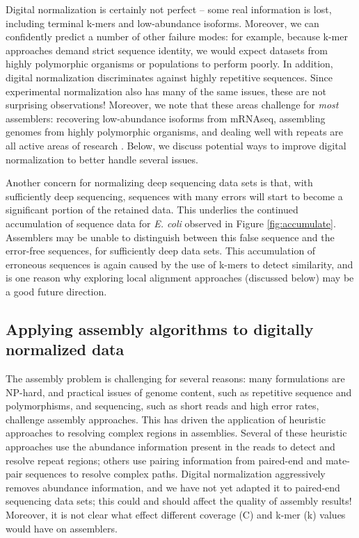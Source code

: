 \documentclass[10pt]{article}
\begin{document}
Digital normalization is certainly not perfect -- some real
information is lost, including terminal k-mers and low-abundance
isoforms.  Moreover, we can confidently predict a number of other
failure modes: for example, because k-mer approaches demand strict
sequence identity, we would expect datasets from highly polymorphic
organisms or populations to perform poorly.  In addition, digital
normalization discriminates against highly repetitive sequences. Since
experimental normalization also has many of the same issues, these are
not surprising observations!  Moreover, we note that these areas
challenge for {\em most} assemblers: recovering low-abundance isoforms
from mRNAseq, assembling genomes from highly polymorphic organisms,
and dealing well with repeats are all active areas of research
\cite{pubmed18549302,pubmed20633259,pubmed18541131}.  Below, we
discuss potential ways to improve digital normalization to better
handle several issues.

Another concern for normalizing deep sequencing data sets is that,
with sufficiently deep sequencing, sequences with many errors will
start to become a significant portion of the retained data.  This
underlies the continued accumulation of sequence data for {\em
  E. coli} observed in Figure \ref{fig:accumulate}.  Assemblers may be
unable to distinguish between this false sequence and the error-free
sequences, for sufficiently deep data sets.  This accumulation of
erroneous sequences is again caused by the use of k-mers to detect
similarity, and is one reason why exploring local alignment approaches
(discussed below) may be a good future direction.

\subsection*{Applying assembly algorithms to digitally normalized data}

The assembly problem is challenging for several reasons: many
formulations are NP-hard, and practical issues of genome content, such
as repetitive sequence and polymorphisms, and sequencing, such as
short reads and high error rates, challenge assembly approaches.  This
has driven the application of heuristic approaches to resolving
complex regions in assemblies.  Several of these heuristic approaches
use the abundance information present in the reads to detect and
resolve repeat regions; others use pairing information from paired-end
and mate-pair sequences to resolve complex paths.  Digital
normalization aggressively removes abundance information, and we have
not yet adapted it to paired-end sequencing data sets; this could and
should affect the quality of assembly results! Moreover, it is not
clear what effect different coverage (C) and k-mer (k) values would
have on assemblers.
\end{document}

